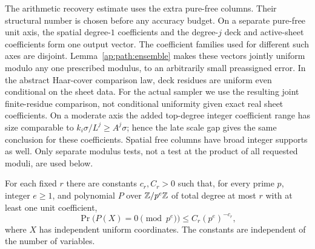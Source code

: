 The arithmetic recovery estimate uses the extra pure-free columns.
Their structural number is chosen before any accuracy budget.  On a
separate pure-free unit axis, the spatial degree-$1$ coefficients and
the degree-$j$ deck and active-sheet coefficients form one output
vector.  The coefficient families used for different such axes are
disjoint.  Lemma~\ref{ap:path:ensemble} makes these
vectors jointly uniform modulo any one prescribed modulus, to an
arbitrarily small preassigned error.  In the abstract Haar-cover
comparison law, deck residues are uniform even conditional on the
sheet data.  For the actual sampler we use the resulting joint
finite-residue comparison, not conditional uniformity given exact
real sheet coefficients.  On a moderate axis the added
top-degree integer coefficient range has size comparable to
$k_i\sigma/L^j\ge A^j\sigma$; hence the late scale gap gives the same
conclusion for these coefficients.  Spatial free columns have broad
integer supports as well.  Only separate modulus tests, not a test
at the product of all requested moduli, are used below.

\begin{lemma}\label{ap:major:padic}
For each fixed $r$ there are constants $c_r,C_r>0$ such that, for every
prime $p$, integer $e\ge1$, and polynomial $P$ over $\mathbb Z/p^e\mathbb Z$ of
total degree at most $r$ with at least one unit coefficient,
\[
       \Pr\bigl(P(X)=0\pmod {p^e}\bigr)
               \le C_r(p^e)^{-c_r},
\]
where $X$ has independent uniform coordinates.  The constants are
independent of the number of variables.
\end{lemma}

